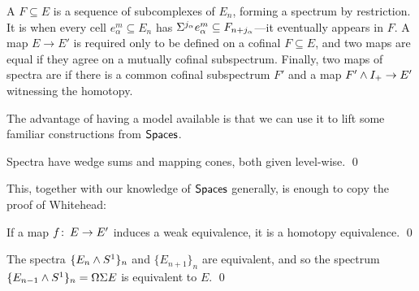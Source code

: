 \begin{definition}
A  $F \subseteq E$ is a sequence of subcomplexes of $E_n$, forming a spectrum by restriction.
It is  when every cell $e^m_\alpha \subseteq E_n$ has $\Sigma^{j_\alpha} e^m_\alpha \subseteq F_{n+j_\alpha}$---it eventually appears in $F$.
A map $E \to E'$ is required only to be defined on a cofinal $F \subseteq E$, and two maps are equal if they agree on a mutually cofinal subspectrum.%
Finally, two maps of spectra are  if there is a common cofinal subspectrum $F'$ and a map $F' \wedge I_+ \to E'$ witnessing the homotopy.
\end{definition}

The advantage of having a model available is that we can use it to lift some familiar constructions from $\mathsf{Spaces}$.

\begin{lemma}
Spectra have wedge sums and mapping cones, both given level-wise. \qed
\end{lemma}

This, together with our knowledge of $\mathsf{Spaces}$ generally, is enough to copy the proof of Whitehead:

\begin{theorem}
If a map $f\colon\thinspace E \to E'$ induces a weak equivalence, it is a homotopy equivalence. \qed
\end{theorem}

\begin{corollary}
The spectra $\{E_n \wedge S^1\}_n$ and $\{E_{n+1}\}_n$ are equivalent, and so the spectrum $\{E_{n-1} \wedge S^1\}_n = \Omega \Sigma E$ is equivalent to $E$. \qed
\end{corollary}







